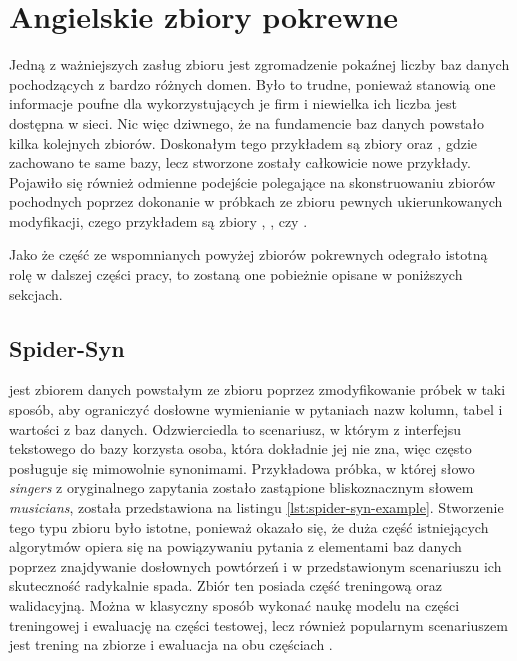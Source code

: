 \section{Angielskie zbiory pokrewne} \label{text:related-datasets}
Jedną z ważniejszych zasług zbioru  jest zgromadzenie pokaźnej liczby baz danych pochodzących z bardzo różnych domen. Było to trudne, ponieważ stanowią one informacje poufne dla wykorzystujących je firm i niewielka ich liczba jest dostępna w sieci. Nic więc dziwnego, że na fundamencie baz danych  powstało kilka kolejnych zbiorów. Doskonałym tego przykładem są zbiory   oraz  , gdzie zachowano te same bazy, lecz stworzone zostały całkowicie nowe przykłady. Pojawiło się również odmienne podejście polegające na skonstruowaniu zbiorów pochodnych poprzez dokonanie w próbkach ze zbioru  pewnych ukierunkowanych modyfikacji, czego przykładem są zbiory  ,  , czy  .

Jako że część ze wspomnianych powyżej zbiorów pokrewnych  odegrało istotną rolę w dalszej części pracy, to zostaną one pobieżnie opisane w poniższych sekcjach.

\subsection{Spider-Syn}
  jest zbiorem danych powstałym ze zbioru  poprzez zmodyfikowanie próbek w taki sposób, aby ograniczyć dosłowne wymienianie w pytaniach nazw kolumn, tabel i wartości z baz danych. Odzwierciedla to scenariusz, w którym z interfejsu tekstowego do bazy korzysta osoba, która dokładnie jej nie zna, więc często posługuje się mimowolnie synonimami. Przykładowa próbka, w której słowo \textit{singers} z oryginalnego zapytania zostało zastąpione bliskoznacznym słowem \textit{musicians}, została przedstawiona na listingu \ref{lst:spider-syn-example}. Stworzenie tego typu zbioru było istotne, ponieważ okazało się, że duża część istniejących algorytmów opiera się na powiązywaniu pytania z elementami baz danych poprzez znajdywanie dosłownych powtórzeń i w przedstawionym scenariuszu ich skuteczność radykalnie spada. Zbiór ten posiada część treningową oraz walidacyjną. Można w klasyczny sposób wykonać naukę modelu na części treningowej i ewaluację na części testowej, lecz również popularnym scenariuszem jest trening na zbiorze  i ewaluacja na obu częściach .


